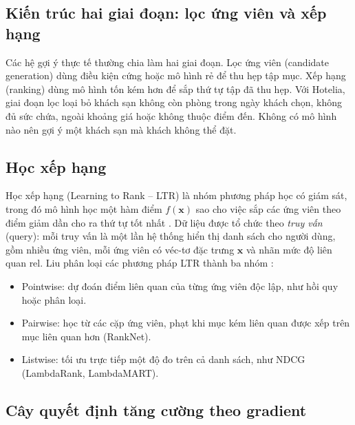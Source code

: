 \subsection{Kiến trúc hai giai đoạn: lọc ứng viên và xếp hạng}

Các hệ gợi ý thực tế thường chia làm hai giai đoạn. Lọc ứng viên (candidate generation) dùng điều kiện cứng hoặc mô hình rẻ để thu hẹp tập mục. Xếp hạng (ranking) dùng mô hình tốn kém hơn để sắp thứ tự tập đã thu hẹp. Với Hotelia, giai đoạn lọc loại bỏ khách sạn không còn phòng trong ngày khách chọn, không đủ sức chứa, ngoài khoảng giá hoặc không thuộc điểm đến. Không có mô hình nào nên gợi ý một khách sạn mà khách không thể đặt.

\subsection{Học xếp hạng}

Học xếp hạng (Learning to Rank -- LTR) là nhóm phương pháp học có giám sát, trong đó mô hình học một hàm điểm $f(\mathbf{x})$ sao cho việc sắp các ứng viên theo điểm giảm dần cho ra thứ tự tốt nhất \cite{liu2009}. Dữ liệu được tổ chức theo \emph{truy vấn} (query): mỗi truy vấn là một lần hệ thống hiển thị danh sách cho người dùng, gồm nhiều ứng viên, mỗi ứng viên có véc-tơ đặc trưng $\mathbf{x}$ và nhãn mức độ liên quan $\text{rel}$. Liu phân loại các phương pháp LTR thành ba nhóm \cite{liu2009}:
\begin{itemize}
\item Pointwise: dự đoán điểm liên quan của từng ứng viên độc lập, như hồi quy hoặc phân loại.
\item Pairwise: học từ các cặp ứng viên, phạt khi mục kém liên quan được xếp trên mục liên quan hơn (RankNet).
\item Listwise: tối ưu trực tiếp một độ đo trên cả danh sách, như NDCG (LambdaRank, LambdaMART).
\end{itemize}

\subsection{Cây quyết định tăng cường theo gradient}

